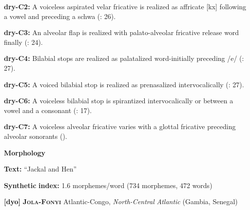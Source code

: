 \documentclass[output=paper]{langsci/langscibook}
\begin{document}
\begin{styleBody}
\textbf{dry-C2:} A voiceless aspirated velar fricative is realized as affricate [kx] following a vowel and preceding a schwa (\citealt{KotapishKotapish1978}: 26).
\end{styleBody}

\begin{styleBody}
\textbf{dry-C3:} An alveolar flap is realized with palato-alveolar fricative release word finally (\citealt{KotapishKotapish1978}: 24).
\end{styleBody}

\begin{styleBody}
\textbf{dry-C4:} Bilabial stops are realized as palatalized word-initially preceding /e/ (\citealt{KotapishKotapish1978}: 27).
\end{styleBody}

\begin{styleBody}
\textbf{dry-C5:} A voiced bilabial stop is realized as prenasalized intervocalically (\citealt{KotapishKotapish1978}: 27).
\end{styleBody}

\begin{styleBody}
\textbf{dry-C6:} A voiceless bilabial stop is spirantized intervocalically or between a vowel and a consonant (\citealt{KotapishKotapish1978}: 17).
\end{styleBody}

\begin{styleBody}
\textbf{dry-C7:} A voiceless alveolar fricative varies with a glottal fricative preceding alveolar sonorants (\citealt{KotapishKotapish1978}).
\end{styleBody}

\begin{styleBody}
\textbf{Morphology}
\end{styleBody}

\begin{styleBody}
\textbf{Text:} “Jackal and Hen” \citep[180-192]{Dhakal2012}
\end{styleBody}

\begin{styleBody}
\textbf{Synthetic} \textbf{index:} 1.6 morphemes/word (734 morphemes, 472 words)
\end{styleBody}

\begin{styleBody}
\textbf{[dyo]}   \textbf{\textsc{Jola-Fonyi}}  Atlantic-Congo, \textit{North-Central} \textit{Atlantic} (Gambia, Senegal)
\end{styleBody}
\end{document}
